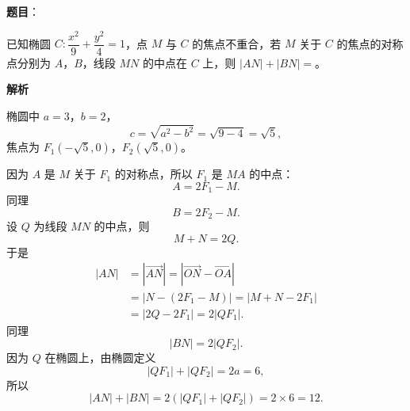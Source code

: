 \begin{answer}

\textbf{题目}：

已知椭圆 $C:\dfrac{x^2}9+\dfrac{y^2}4=1$，点 $M$ 与 $C$ 的焦点不重合，若 $M$ 关于 $C$ 的焦点的对称点分别为 $A$，$B$，线段 $MN$ 的中点在 $C$ 上，则 $|AN|+|BN|=$\gkblank{}。

\textbf{解析}

椭圆中 $a=3$，$b=2$，
\nopagebreak[4]
\[c=\sqrt{a^2-b^2}=\sqrt{9-4}=\sqrt5,\]
焦点为 $F_1(-\sqrt5,0)$，$F_2(\sqrt5,0)$。

因为 $A$ 是 $M$ 关于 $F_1$ 的对称点，所以 $F_1$ 是 $MA$ 的中点：
\nopagebreak[4]
\[A=2F_1-M.\]
同理
\nopagebreak[4]
\[B=2F_2-M.\]
设 $Q$ 为线段 $MN$ 的中点，则
\nopagebreak[4]
\[M+N=2Q.\]
于是
\nopagebreak[4]
\[\begin{aligned}
|AN|&=|\overrightarrow{AN}|=|\overrightarrow{ON}-\overrightarrow{OA}|\\
&=|N-(2F_1-M)|=|M+N-2F_1|\\
&=|2Q-2F_1|=2|QF_1|.
\end{aligned}\]
同理
\nopagebreak[4]
\[|BN|=2|QF_2|.\]
因为 $Q$ 在椭圆上，由椭圆定义
\nopagebreak[4]
\[|QF_1|+|QF_2|=2a=6,\]
所以
\nopagebreak[4]
\[|AN|+|BN|=2\left(|QF_1|+|QF_2|\right)=2\times6=12.\]


\end{answer}
